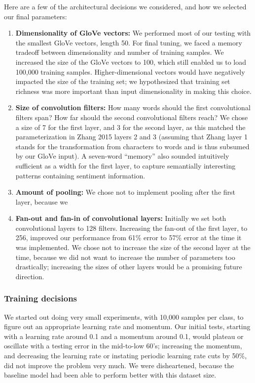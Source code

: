 \documentclass{article}
\begin{document}
Here are a few of the architectural decisions we considered, and how we selected our final parameters:
\begin{enumerate}
\item{\textbf{Dimensionality of GloVe vectors:}} We performed most of our testing with the smallest GloVe vectors, length 50. For final tuning, we faced a memory tradeoff between dimensionality and number of training samples. We increased the size of the GloVe vectors to 100, which still enabled us to load 100,000 training samples. Higher-dimensional vectors would have negatively impacted the size of the training set; we hypothesized that training set richness was more important than input dimensionality in making this choice.
\item{\textbf{Size of convolution filters:}} How many words should the first convolutional filters span? How far should the second convolutional filters reach? We chose a size of 7 for the first layer, and 3 for the second layer, as this matched the parameterization in Zhang 2015 layers 2 and 3 (assuming that Zhang layer 1 stands for the transformation from characters to words and is thus subsumed by our GloVe input). A seven-word ``memory'' also sounded intuitively sufficient as a width for the first layer, to capture semantially interesting patterns containing sentiment information.
\item{\textbf{Amount of pooling:}} We chose not to implement pooling after the first layer, because we 
\item{\textbf{Fan-out and fan-in of convolutional layers:}} Initially we set both convolutional layers to 128 filters. Increasing the fan-out of the first layer, to 256, improved our performance from 61\% error to 57\% error at the time it was implemented. We chose not to increase the size of the second layer at the time, because we did not want to increase the number of parameters too drastically; increasing the sizes of other layers would be a promising future direction.
\end{enumerate}

\subsubsection{Training decisions}

We started out doing very small experiments, with 10,000 samples per class, to figure out an appropriate learning rate and momentum. Our initial tests, starting with a learning rate around 0.1 and a momentum around 0.1, would plateau or oscillate with a testing error in the mid-to-low 60's; increasing the momentum, and decreasing the learning rate or instating periodic learning rate cuts by 50\%, did not improve the problem very much. We were disheartened, because the baseline model had been able to perform better with this dataset size.
\end{document}
